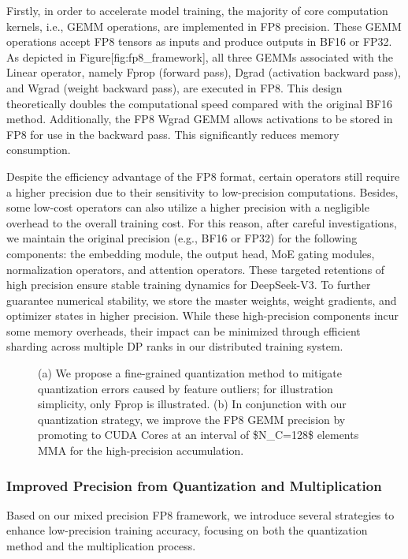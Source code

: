 \documentclass[11pt,a4paper]{article}
\begin{document}
Firstly, in order to accelerate model training, the majority of core computation kernels, i.e., GEMM operations, are implemented in FP8 precision. These GEMM operations accept FP8 tensors as inputs and produce outputs in BF16 or FP32. As depicted in Figure[fig:fp8\_framework], all three GEMMs associated with the Linear operator, namely Fprop (forward pass), Dgrad (activation backward pass), and Wgrad (weight backward pass), are executed in FP8. This design theoretically doubles the computational speed compared with the original BF16 method. Additionally, the FP8 Wgrad GEMM allows activations to be stored in FP8 for use in the backward pass. This significantly reduces memory consumption.

Despite the efficiency advantage of the FP8 format, certain operators still require a higher precision due to their sensitivity to low-precision computations. Besides, some low-cost operators can also utilize a higher precision with a negligible overhead to the overall training cost. For this reason, after careful investigations, we maintain the original precision (e.g., BF16 or FP32) for the following components: the embedding module, the output head, MoE gating modules, normalization operators, and attention operators. These targeted retentions of high precision ensure stable training dynamics for DeepSeek-V3. To further guarantee numerical stability, we store the master weights, weight gradients, and optimizer states in higher precision. While these high-precision components incur some memory overheads, their impact can be minimized through efficient sharding across multiple DP ranks in our distributed training system.

\begin{figure}[h]
\caption{(a) We propose a fine-grained quantization method to mitigate quantization errors caused by feature outliers; for illustration simplicity, only Fprop is illustrated. (b) In conjunction with our quantization strategy, we improve the FP8 GEMM precision by promoting to CUDA Cores at an interval of  \$N\_C=128\$  elements MMA for the high-precision accumulation.}
\end{figure}

\subsubsection{Improved Precision from Quantization and Multiplication}

Based on our mixed precision FP8 framework, we introduce several strategies to enhance low-precision training accuracy, focusing on both the quantization method and the multiplication process.
\end{document}
